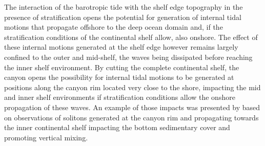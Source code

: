 The interaction of the barotropic tide with the shelf edge topography
in the presence of stratification opens the potential for generation
of internal tidal motions that propagate offshore to the deep ocean
domain and, if the stratification conditions of the continental shelf
allow, also onshore. The effect of these internal motions generated at
the shelf edge however remains largely confined to the outer and
mid-shelf, the waves being dissipated before reaching the inner shelf
environment. By cutting the complete continental shelf, the \naz
canyon opens the possibility for internal tidal motions to be
generated at positions along the canyon rim located very close to the
shore, impacting the mid and inner shelf environments if
stratification conditions allow the onshore propagation of these
waves. An example of those impacts was presented by \cite{quaresma07}
based on observations of solitons generated at the canyon rim and
propagating towards the inner continental shelf impacting the bottom
sedimentary cover and promoting vertical mixing.


 
